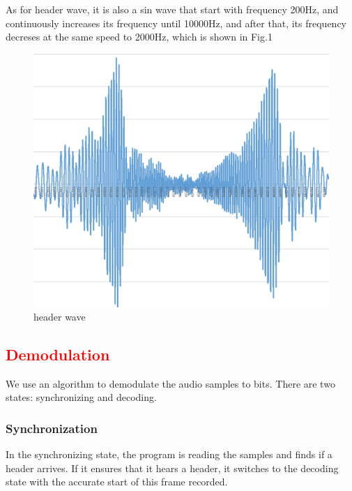 \documentclass[11pt, conference]{IEEEtran}
\newcommand{\tcr}{\textcolor{red}}
\begin{document}
As for header wave, it is also a sin wave that start with frequency 200Hz, and continuously increases its frequency until 10000Hz, and after that, its
frequency decreses at the same speed to 2000Hz, which is shown in Fig.1

\begin{figure}[!h]
	\centering
	\includegraphics[scale=0.4]{header_wave.png}
	\caption{header wave}\label{}
	\end{figure}

\subsection{\tcr{Demodulation}}

We use an algorithm to demodulate the audio samples to bits. There are two states: synchronizing and decoding.

\subsubsection{Synchronization}

In the synchronizing state, the program is reading the samples and finds if a header arrives. If it ensures that it hears a header, it switches to the decoding state with the accurate start of this frame recorded.
\end{document}
